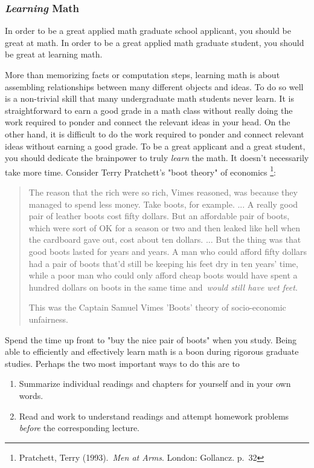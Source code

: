 \documentclass[11pt]{article}
\begin{document}
\subsubsection*{\emph{Learning} Math}
In order to be a great applied math graduate school applicant, you should be great at math. In order to be a great applied math graduate student, you should be great at learning math. 

More than memorizing facts or computation steps, learning math is about assembling relationships between many different objects and ideas. To do so well is a non-trivial skill that many undergraduate math students never learn. It is straightforward to earn a good grade in a math class without really doing the work required to ponder and connect the relevant ideas in your head. On the other hand, it is difficult to do the work required to ponder and connect relevant ideas without earning a good grade. To be a great applicant and a great student, you should dedicate the brainpower to truly \emph{learn} the math. It doesn't necessarily take more time. Consider Terry Pratchett's "boot theory" of economics \footnote{Pratchett, Terry (1993). \textit{Men at Arms}. London: Gollancz. p. 32}:

\begin{quote}
The reason that the rich were so rich, Vimes reasoned, was because they managed to spend less money. Take boots, for example. ... A really good pair of leather boots cost fifty dollars. But an affordable pair of boots, which were sort of OK for a season or two and then leaked like hell when the cardboard gave out, cost about ten dollars. ... But the thing was that good boots lasted for years and years. A man who could afford fifty dollars had a pair of boots that'd still be keeping his feet dry in ten years' time, while a poor man who could only afford cheap boots would have spent a hundred dollars on boots in the same time and \textit{would still have wet feet}.   

This was the Captain Samuel Vimes 'Boots' theory of socio-economic unfairness.
\end{quote}

Spend the time up front to "buy the nice pair of boots" when you study. Being able to efficiently and effectively learn math is a boon during rigorous graduate studies. Perhaps the two most important ways to do this are to
\begin{enumerate}
\item Summarize individual readings and chapters for yourself and in your own words.
\item Read and work to understand readings and attempt homework problems \emph{before} the corresponding lecture.
\end{enumerate}
\end{document}
